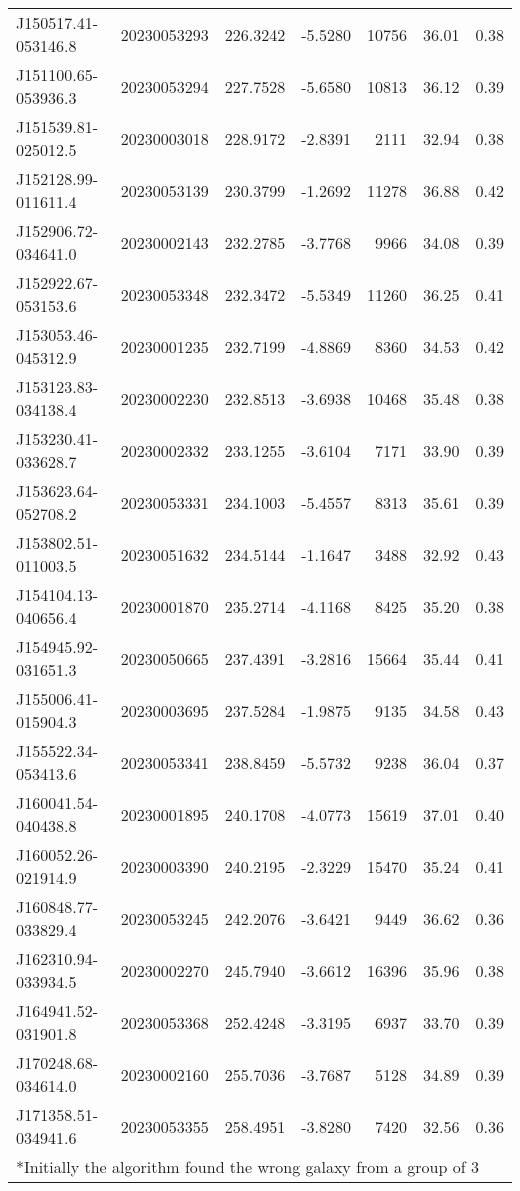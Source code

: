 \documentclass{article}
\begin{document}
\begin {longtable}{|l|l|r|r|r|r|r|}
 J150517.41-053146.8&  20230053293&  226.3242&   -5.5280& 10756& 36.01& 0.38\\
 J151100.65-053936.3&  20230053294&  227.7528&   -5.6580& 10813& 36.12& 0.39\\
 J151539.81-025012.5&  20230003018&  228.9172&   -2.8391&  2111& 32.94& 0.38\\
 J152128.99-011611.4&  20230053139&  230.3799&   -1.2692& 11278& 36.88& 0.42\\
 J152906.72-034641.0&  20230002143&  232.2785&   -3.7768&  9966& 34.08& 0.39\\
 J152922.67-053153.6&  20230053348&  232.3472&   -5.5349& 11260& 36.25& 0.41\\
 J153053.46-045312.9&  20230001235&  232.7199&   -4.8869&  8360& 34.53& 0.42\\
 J153123.83-034138.4&  20230002230&  232.8513&   -3.6938& 10468& 35.48& 0.38\\
 J153230.41-033628.7&  20230002332&  233.1255&   -3.6104&  7171& 33.90& 0.39\\
 J153623.64-052708.2&  20230053331&  234.1003&   -5.4557&  8313& 35.61& 0.39\\
 J153802.51-011003.5&  20230051632&  234.5144&   -1.1647&  3488& 32.92& 0.43\\
 J154104.13-040656.4&  20230001870&  235.2714&   -4.1168&  8425& 35.20& 0.38\\
 J154945.92-031651.3&  20230050665&  237.4391&   -3.2816& 15664& 35.44& 0.41\\
 J155006.41-015904.3&  20230003695&  237.5284&   -1.9875&  9135& 34.58& 0.43\\
 J155522.34-053413.6&  20230053341&  238.8459&   -5.5732&  9238& 36.04& 0.37\\
 J160041.54-040438.8&  20230001895&  240.1708&   -4.0773& 15619& 37.01& 0.40\\
 J160052.26-021914.9&  20230003390&  240.2195&   -2.3229& 15470& 35.24& 0.41\\
 J160848.77-033829.4&  20230053245&  242.2076&   -3.6421&  9449& 36.62& 0.36\\
 J162310.94-033934.5&  20230002270&  245.7940&   -3.6612& 16396& 35.96& 0.38\\
 J164941.52-031901.8&  20230053368&  252.4248&   -3.3195&  6937& 33.70& 0.39\\
 J170248.68-034614.0&  20230002160&  255.7036&   -3.7687&  5128& 34.89& 0.39\\
 J171358.51-034941.6&  20230053355&  258.4951&   -3.8280&  7420& 32.56& 0.36\\
 \hline
 \multicolumn{7}{l}{*Initially the algorithm found the wrong galaxy from a group of 3}
 \\
 \end{longtable}
\end{document}
